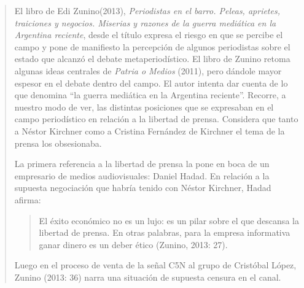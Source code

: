 \begin{quote}
El libro de Edi Zunino(2013), \emph{Periodistas en el barro. Peleas, aprietes, traiciones y negocios. Miserias y razones de la guerra mediática en la Argentina reciente}, desde el título expresa el riesgo en que se percibe el campo y pone de manifiesto la percepción de algunos periodistas sobre el estado que alcanzó el debate metaperiodístico. El libro de Zunino retoma algunas ideas centrales de \emph{Patria o Medios} (2011), pero dándole mayor espesor en el debate dentro del campo. El autor intenta dar cuenta de lo que denomina ``la guerra mediática en la Argentina reciente''. Recorre, a nuestro modo de ver, las distintas posiciones que se expresaban en el campo periodístico en relación a la libertad de prensa. Considera que tanto a Néstor Kirchner como a Cristina Fernández de Kirchner el tema de la prensa los obsesionaba.

La primera referencia a la libertad de prensa la pone en boca de un empresario de medios audiovisuales: Daniel Hadad. En relación a la supuesta negociación que habría tenido con Néstor Kirchner, Hadad afirma:

\begin{quote}
	El éxito económico no es un lujo: es un pilar sobre el que descansa la libertad de prensa. En otras palabras, para la empresa informativa ganar dinero es un deber ético (Zunino, 2013: 27).
\end{quote}


Luego en el proceso de venta de la señal C5N al grupo de Cristóbal López, Zunino (2013: 36) narra una situación de supuesta censura en el canal.


\end{quote}
